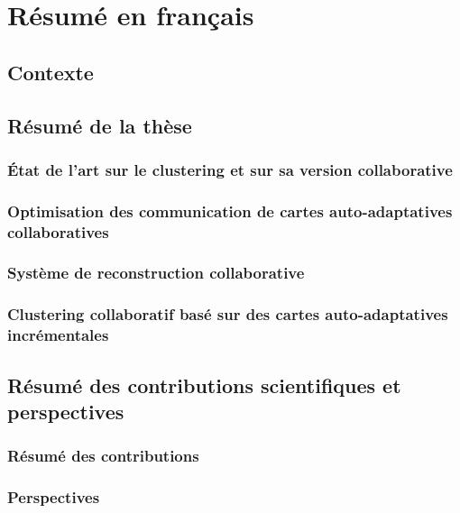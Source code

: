 \chapter{Résumé en français}

\section{Contexte}

\section{Résumé de la thèse}

\subsection{État de l'art sur le clustering et sur sa version collaborative}

\subsection{Optimisation des communication de cartes auto-adaptatives collaboratives}

\subsection{Système de reconstruction collaborative}

\subsection{Clustering collaboratif basé sur des cartes auto-adaptatives incrémentales}

\section{Résumé des contributions scientifiques et perspectives}

\subsection{Résumé des contributions}

\subsection{Perspectives}
